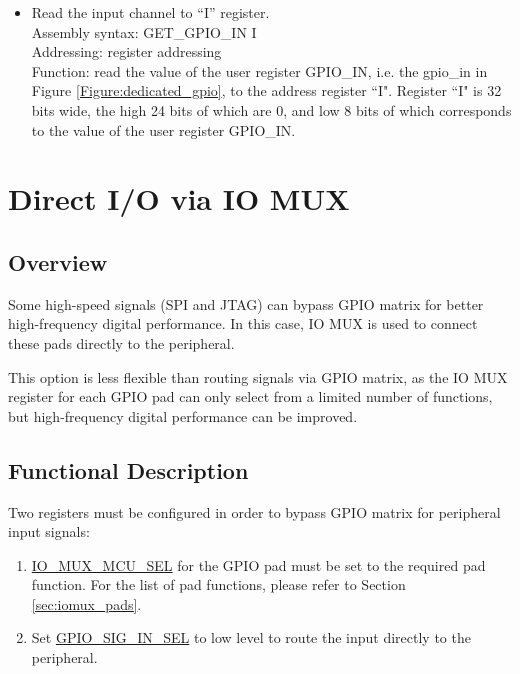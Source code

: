 \documentclass[main\_\_EN.tex]{subfiles}
\begin{document}
\begin{itemize}
    Assembly syntax: RUR.GPIO\_OUT arr \\
    Addressing: register addressing \\
    Function: read the value of the user register GPIO\_OUT to the address register ``arr". Register ``arr" is 32 bits wide, and only low 8 bits are valid when using this instruction.
    \item Read the input channel to ``I'' register. \\
    Assembly syntax: GET\_GPIO\_IN I \\
    Addressing: register addressing \\
    Function: read the value of the user register GPIO\_IN, i.e. the gpio\_in in Figure \ref{Figure:dedicated_gpio}, to the address register ``I". Register ``I" is 32 bits wide, the high 24 bits of which are 0, and low 8 bits of which corresponds to the value of the user register GPIO\_IN.
\end{itemize}

\section{Direct I/O via IO MUX}

\subsection{Overview}

Some high-speed signals (SPI and JTAG) can bypass GPIO matrix for better high-frequency digital performance. In this case, IO MUX is used to connect these pads directly to the peripheral.

This option is less flexible than routing signals via GPIO matrix, as the IO MUX register for each GPIO pad can only select from a limited number of functions, but high-frequency digital performance can be improved.

\subsection{Functional Description}

Two registers must be configured in order to bypass GPIO matrix for peripheral input signals:

\begin{enumerate}
\item \hyperref[fielddesc:IOMUXMCUSEL]{IO\_MUX\_MCU\_SEL} for the GPIO pad must be set to the required pad function. For the list of pad functions, please refer to Section \ref{sec:iomux_pads}.
\item Set \hyperref[fielddesc:GPIOSIGNINSEL]{GPIO\_SIG\_IN\_SEL} to low level to route the input directly to the peripheral.
\end{enumerate}
\end{document}
